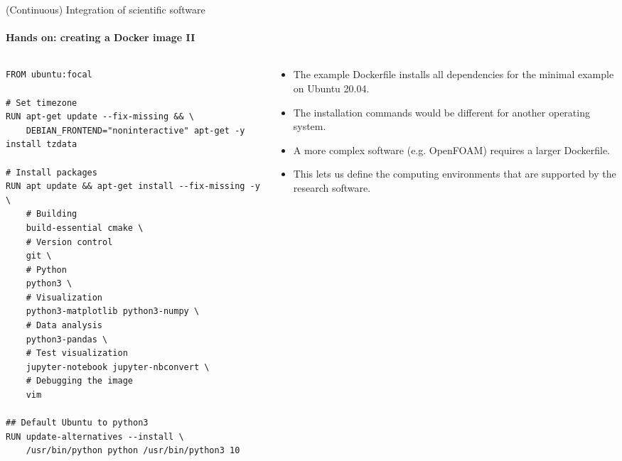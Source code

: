 \begin{frame}[fragile]{(Continuous) Integration of scientific software} 
    \framesubtitle{Hands on: creating a Docker image II} 
    \vfill
    \begin{columns}
        \begin{column}[c]{0.5\textwidth}
    \begin{verbatim}
FROM ubuntu:focal 

# Set timezone
RUN apt-get update --fix-missing && \
    DEBIAN_FRONTEND="noninteractive" apt-get -y install tzdata

# Install packages
RUN apt update && apt-get install --fix-missing -y \
    # Building
    build-essential cmake \
    # Version control
    git \
    # Python
    python3 \ 
    # Visualization
    python3-matplotlib python3-numpy \
    # Data analysis
    python3-pandas \
    # Test visualization
    jupyter-notebook jupyter-nbconvert \
    # Debugging the image 
    vim  

## Default Ubuntu to python3
RUN update-alternatives --install \
    /usr/bin/python python /usr/bin/python3 10 
    \end{verbatim}
        \end{column}
        \begin{column}[c]{0.5\textwidth}
            \begin{itemize}
                \item The example Dockerfile installs all dependencies for the minimal example on Ubuntu 20.04.
                \item The installation commands would be different for another operating system.  
                \item A more complex software (e.g. OpenFOAM) requires a larger Dockerfile.
                \item This lets us define the computing environments that are supported by the research software. 
            \end{itemize}
        \end{column}
    \end{columns}
\end{frame}

